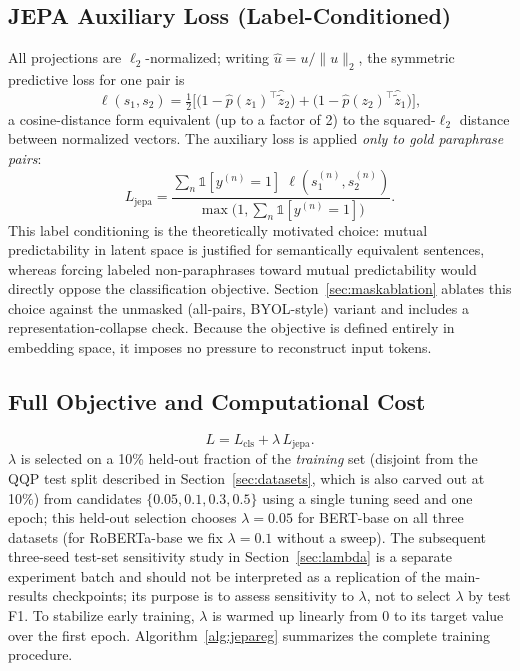 \documentclass[sigconf]{acmart}
\begin{document}
\subsection{JEPA Auxiliary Loss (Label-Conditioned)}
\label{sec:loss}
All projections are $\ell_2$-normalized; writing $\hat{u} = u / \lVert u \rVert_2$, the symmetric predictive loss for one pair is
\begin{equation}
\ell(s_1, s_2) = \tfrac{1}{2}\Big[\big(1 - \hat{p}(z_1)^\top \hat{\tilde z}_2\big) + \big(1 - \hat{p}(z_2)^\top \hat{\tilde z}_1\big)\Big],
\label{eq:pairloss}
\end{equation}
a cosine-distance form equivalent (up to a factor of 2) to the squared-$\ell_2$ distance between normalized vectors. The auxiliary loss is applied \emph{only to gold paraphrase pairs}:
\begin{equation}
L_{\mathrm{jepa}} = \frac{\sum_n \mathbb{1}[y^{(n)}{=}1]\; \ell(s_1^{(n)}, s_2^{(n)})}{\max\big(1, \sum_n \mathbb{1}[y^{(n)}{=}1]\big)}.
\label{eq:jepa}
\end{equation}
This label conditioning is the theoretically motivated choice: mutual predictability in latent space is justified for semantically equivalent sentences, whereas forcing labeled non-paraphrases toward mutual predictability would directly oppose the classification objective. Section~\ref{sec:maskablation} ablates this choice against the unmasked (all-pairs, BYOL-style) variant and includes a representation-collapse check. Because the objective is defined entirely in embedding space, it imposes no pressure to reconstruct input tokens.

\subsection{Full Objective and Computational Cost}
\label{sec:objective}
\begin{equation}
L = L_{\mathrm{cls}} + \lambda\, L_{\mathrm{jepa}}.
\label{eq:full}
\end{equation}
$\lambda$ is selected on a 10\% held-out fraction of the \emph{training} set (disjoint from the QQP test split described in Section~\ref{sec:datasets}, which is also carved out at 10\%) from candidates $\{0.05, 0.1, 0.3, 0.5\}$ using a single tuning seed and one epoch; this held-out selection chooses $\lambda=0.05$ for BERT-base on all three datasets (for RoBERTa-base we fix $\lambda=0.1$ without a sweep). The subsequent three-seed test-set sensitivity study in Section~\ref{sec:lambda} is a separate experiment batch and should not be interpreted as a replication of the main-results checkpoints; its purpose is to assess sensitivity to $\lambda$, not to select $\lambda$ by test F1. To stabilize early training, $\lambda$ is warmed up linearly from 0 to its target value over the first epoch. Algorithm~\ref{alg:jepareg} summarizes the complete training procedure.
\end{document}
